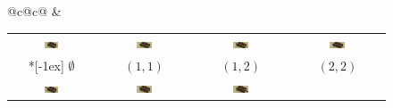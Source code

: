 \begin{figure}
  \centering
  \begin{tabular}{@{}c@{\hspace{2pt}}c@{}}
    &
    \begin{tabular}[b]{@{}c@{\hspace{2pt}}c@{\hspace{2pt}}c@{\hspace{2pt}}c@{}}
      \includegraphics[width=0.18\textwidth]{images/poss-0-small}&
      \includegraphics[width=0.18\textwidth]{images/poss-1-small}&
      \includegraphics[width=0.18\textwidth]{images/poss-2-small}&
      \includegraphics[width=0.18\textwidth]{images/poss-3-small}\\*[-1ex]
      {\tiny $\emptyset$}&{\tiny $(1,1)$}&{\tiny $(1,2)$}&{\tiny $(2,2)$}\\
      \includegraphics[width=0.18\textwidth]{images/poss-4-small}&
      \includegraphics[width=0.18\textwidth]{images/poss-5-small}&
      \includegraphics[width=0.18\textwidth]{images/poss-6-small}&

\end{tabular}
\end{tabular}
\end{figure}
